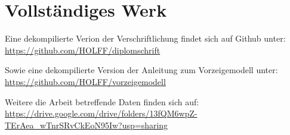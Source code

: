 \newpage
{}
\chapter*{Vollständiges Werk}

Eine dekompilierte Verion der Verschriftlichung findet sich auf Github unter:
\newline
\url{https://github.com/HOLFF/diplomschrift}

Sowie eine dekompilierte Version der Anleitung zum Vorzeigemodell unter:
\newline
\url{https://github.com/HOLFF/vorzeigemodell}

Weitere die Arbeit betreffende Daten finden sich auf:
\newline
\url{https://drive.google.com/drive/folders/13fQM6wpZ-TErAea_wTnrSRvCkEoN95Iw?usp=sharing}